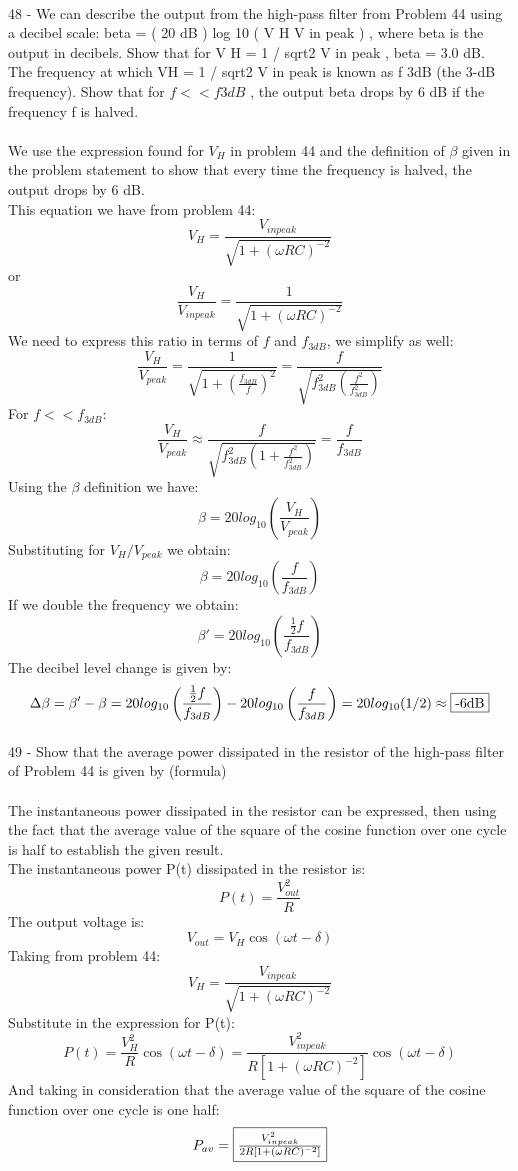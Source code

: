 \documentclass{report}
\begin{document}
\paragraph{}
48 - We can describe the output from the high-pass filter from Problem 44 using a decibel scale: beta = ( 20 dB ) log 10 ( V H V in peak ) , where beta is the output in decibels. Show that for V H = 1 / sqrt2 V in peak , beta = 3.0 dB. The frequency at which VH = 1 / sqrt2 V in peak is known as f 3dB (the 3-dB frequency). Show that for $f << f 3dB$ , the output beta drops by 6 dB if the frequency f is halved.\\
\\
We use the expression found for $V_H$ in problem 44 and the definition of $\beta$ given in the problem statement to show that every time the frequency is halved, the output drops by 6 dB.\\
This equation we have from problem 44:
$$V_H = \frac{V_{in peak}}{\sqrt{1 + (\omega RC)^{-2}}}$$
or
$$\frac{V_H}{V_{in peak}} = \frac{1}{\sqrt{1 + (\omega RC)^{-2}}}$$
We need to express this ratio in terms of $f$ and $f_{3dB}$, we simplify as well:
$$\frac{V_H}{V_{peak}} = \frac{1}{\sqrt{1 + \left( \frac{f_{3dB}}{f} \right)^2}} = \frac{f}{\sqrt{f_{3dB}^2\left( \frac{f^2}{f_{3dB}^2} \right)}}$$
For $f << f_{3dB}$:
$$\frac{V_H}{V_{peak}} \approx \frac{f}{\sqrt{f_{3dB}^2 \left( 1 + \frac{f^2}{f_{3dB}^2} \right)}} = \frac{f}{f_{3dB}}$$
Using the $\beta$ definition we have:
$$\beta = 20log_{10} \left( \frac{V_H}{V_{peak}} \right)$$
Substituting for $V_H / V_{peak}$ we obtain:
$$\beta = 20log_{10} \left( \frac{f}{f_{3dB}} \right)$$
If we double the frequency we obtain:
$$\beta' = 20log_{10} \left( \frac{\frac{1}{2}f}{f_{3dB}} \right)$$
The decibel level change is given by:
$$\Delta \beta = \beta' - \beta = 20 log_{10}\left(\frac{\frac{1}{2}f}{f_{3dB}}\right) - 20log_{10}\left(\frac{f}{f_{3dB}}\right) = 20log_{10}(1/2) \approx \fbox{-6dB}$$

\paragraph{}
49 - Show that the average power dissipated in the resistor of the high-pass filter of Problem 44 is given by (formula)\\
\\
The instantaneous power dissipated in the resistor can be expressed, then using the fact that the average value of the square of the cosine function over one cycle is half to establish the given result.\\
The instantaneous power P(t) dissipated in the resistor is:
$$P(t) = \frac{V_{out}^2}{R}$$
The output voltage is:
$$V_{out} = V_H\cos (\omega t - \delta)$$
Taking from problem 44:
$$V_H = \frac{V_{in peak}}{\sqrt{1 + (\omega RC)^{-2}}}$$
Substitute in the expression for P(t):
$$P(t) = \frac{V_H^2}{R} \cos (\omega t - \delta) = \frac{V_{in peak}^2}{R[1 + (\omega RC)^{-2}]} \cos (\omega t - \delta)$$
And taking in consideration that the average value of the square of the cosine function over one cycle is one half:
$$P_{av} = \fbox{$\frac{V_{in peak}^2}{2R[1 + (\omega RC)^{-2}]}$}$$
\end{document}
